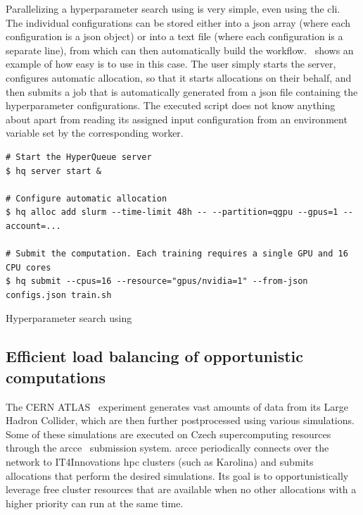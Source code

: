 Parallelizing a hyperparameter search using \hyperqueue{} is very simple, even using the
\gls{cli}. The individual configurations can be stored either into a
\gls{json} array (where each configuration is a \gls{json} object) or
into a text file (where each configuration is a separate line), from which \hq{}
can then automatically build the workflow.~ shows an example of how easy is
to use \hq{} in this case. The user simply starts the server, configures
automatic allocation, so that it starts allocations on their behalf, and then submits a job that is
automatically generated from a \gls{json} file containing the hyperparameter
configurations. The executed script does not know anything about \hyperqueue{} apart from
reading its assigned input configuration from an environment variable set by the corresponding
worker.

\begin{listing}[h]
	\begin{verbatim}
# Start the HyperQueue server
$ hq server start &

# Configure automatic allocation
$ hq alloc add slurm --time-limit 48h -- --partition=qgpu --gpus=1 --account=...

# Submit the computation. Each training requires a single GPU and 16 CPU cores
$ hq submit --cpus=16 --resource="gpus/nvidia=1" --from-json configs.json train.sh
	\end{verbatim}
	\caption{Hyperparameter search using \hyperqueue{}}
	\label{lst:hq-exa4mind-hyperparameter-search}
\end{listing}

\subsection{Efficient load balancing of opportunistic computations}
The CERN ATLAS~\cite{atlas} experiment generates vast amounts of data from its Large
Hadron Collider, which are then further postprocessed using various simulations. Some of these
simulations are executed on Czech supercomputing resources through the
\gls{arcce}~\cite{atlas-it4i-1} submission system. \gls{arcce}
periodically connects over the network to IT4Innovations \gls{hpc} clusters (such as
Karolina) and submits allocations that perform the desired simulations. Its goal is to
opportunistically leverage free cluster resources that are available when no other allocations with
a higher priority can run at the same time.

